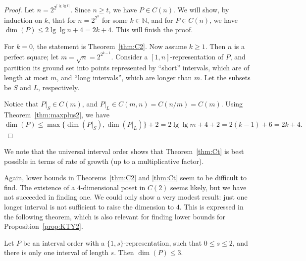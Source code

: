\begin{proof}
Let $n=2^{2^{\lceil\lg\lg t\rceil}}$. Since $n\geq t$, we have $P\in C(n)$. We will show, by induction on $k$, that for $n=2^{2^k}$ for some $k\in\mathbb{N}$, and for $P\in C(n)$, we have $\dim(P)\leq 2\lg\lg n+4=2k+4$. This will finish the proof.

For $k=0$, the statement is Theorem~\ref{thm:C2}. Now assume $k\geq 1$. Then $n$ is a perfect square; let $m=\sqrt{n}=2^{2^{k-1}}$. Consider a $[1,n]$-representation of $P$, and partition its ground set into points represented by ``short'' intervals, which are of length at most $m$, and ``long intervals'', which are longer than $m$. Let the subsets be $S$ and $L$, respectively.

Notice that $P|_S\in C(m)$, and $P|_L\in C(m,n)=C(n/m)=C(m)$. Using Theorem~\ref{thm:maxplus2}, we have
\[
\dim(P)\leq\max\{\dim(P|_S),\dim(P|_L)\}+2=2\lg\lg m+4+2=2(k-1)+6=2k+4.
\]
\end{proof}

We note that the universal interval order shows that Theorem~\ref{thm:Ct} is best possible in terms of rate of growth (up to a multiplicative factor).

Again, lower bounds in Theorems~\ref{thm:C2} and \ref{thm:Ct} seem to be difficult to find. The existence of a $4$-dimensional poset in $C(2)$ seems likely, but we have not succeeded in finding one. We could only show a very modest result: just one longer interval is not sufficient to raise the dimension to $4$. This is expressed in the following theorem, which is also relevant for finding lower bounds for Proposition~\ref{prop:KTY2}.

\begin{theorem}
Let $P$ be an interval order with a $\{1,s\}$-representation, such that $0\leq s\leq 2$, and there is only one interval of length $s$. Then $\dim(P)\leq 3$.
\end{theorem}

